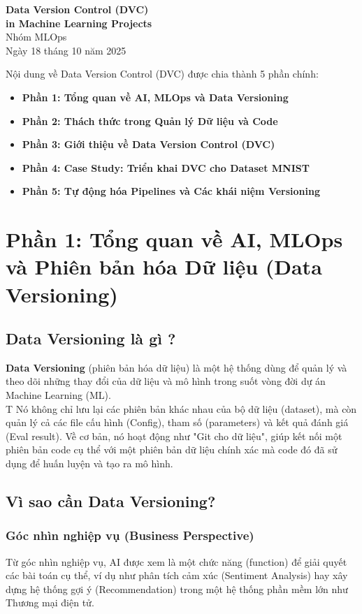\documentclass[11pt]{article}
\renewcommand{\maketitle}{%
    \begin{center}
        \fontsize{18}{20}\selectfont\textbf{Data Version Control (DVC) \\[0.2em] in Machine Learning Projects}\\[1em]
        \fontsize{14}{16}\selectfont Nhóm MLOps\\[0.5em]
        \fontsize{14}{16}\selectfont Ngày 18 tháng 10 năm 2025
    \end{center}
    \vspace{1.5em}
}
\begin{document}
\maketitle

\begin{summarybox}
Nội dung về Data Version Control (DVC) được chia thành 5 phần chính:
    \begin{itemize}
        \item \textbf{Phần 1: Tổng quan về AI, MLOps và Data Versioning}
        \item \textbf{Phần 2: Thách thức trong Quản lý Dữ liệu và Code}
        \item \textbf{Phần 3: Giới thiệu về Data Version Control (DVC)}
        \item \textbf{Phần 4: Case Study: Triển khai DVC cho Dataset MNIST}
        \item \textbf{Phần 5: Tự động hóa Pipelines và Các khái niệm Versioning}
    \end{itemize}
\end{summarybox}

\section{Phần 1: Tổng quan về AI, MLOps và Phiên bản hóa Dữ liệu (Data Versioning)}

\subsection{Data Versioning là gì ?}
\textbf{Data Versioning} (phiên bản hóa dữ liệu) là một hệ thống dùng để quản lý và theo dõi những thay đổi của dữ liệu và mô hình trong suốt vòng đời dự án Machine Learning (ML). \\
T
Nó không chỉ lưu lại các phiên bản khác nhau của bộ dữ liệu (dataset), mà còn quản lý cả các file cấu hình (Config), tham số (parameters) và kết quả đánh giá (Eval result).
Về cơ bản, nó hoạt động như "Git cho dữ liệu", giúp kết nối một phiên bản code cụ thể với một phiên bản dữ liệu chính xác mà code đó đã sử dụng để huấn luyện và tạo ra mô hình.

\subsection{Vì sao cần Data Versioning?}

\subsubsection{Góc nhìn nghiệp vụ (Business Perspective)}
Từ góc nhìn nghiệp vụ, AI được xem là một chức năng (function) để giải quyết các bài toán cụ thể, ví dụ như phân tích cảm xúc (Sentiment Analysis) hay
xây dựng hệ thống gợi ý (Recommendation) trong một hệ thống phần mềm lớn như Thương mại điện tử.
\end{document}
